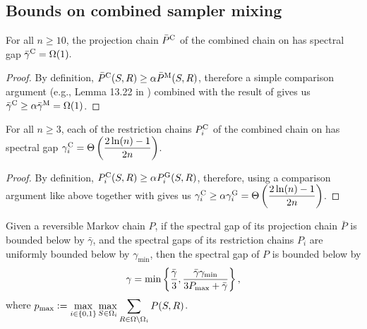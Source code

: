 \subsection{Bounds on combined sampler mixing}

\let\oldthelemma\thelemma
\renewcommand{\thelemma}{B2}
\begin{lemma} \label{lem:cproj}
  For all $n \geq 10$, the projection chain $\bar{P}^{\mathrm{C}}$ of the combined chain on \ising{} has spectral gap $\bar{\gamma}^{\mathrm{C}} = \Omega(1).$
\end{lemma}
\let\thelemma\oldthelemma

\begin{proof}
  By definition, $\bar{P}^{\mathrm{C}}(S, R) \geq \alpha \bar{P}^{\mathrm{M}}(S, R)$, therefore a simple comparison argument (e.g., Lemma 13.22 in \citep{levin08book}) combined with the result of  gives us $\bar{\gamma}^{\mathrm{C}} \geq \alpha \bar{\gamma}^{\mathrm{M}} = \Omega(1)$.
\end{proof}

\let\oldthelemma\thelemma
\renewcommand{\thelemma}{B3}
\begin{lemma} \label{lem:crest}
  For all $n \geq 3$, each of the restriction chains $P^{\mathrm{C}}_i$ of the combined chain on \ising{} has spectral gap $\gamma^{\mathrm{C}}_i = \Theta\left(\displaystyle\frac{2\ln(n) - 1}{2n}\right)$.
\end{lemma}
\let\thelemma\oldthelemma

\begin{proof}
  By definition, $P^{\mathrm{C}}_i(S, R) \geq \alpha P^{\mathrm{G}}_i(S, R)$, therefore, using a comparison argument like above together with  gives us $\gamma^{\mathrm{C}}_i \geq \alpha \gamma^{\mathrm{G}}_i = \Theta\left(\displaystyle\frac{2\ln(n) - 1}{2n}\right)$.
\end{proof}

\let\oldthetheorem\thetheorem
\renewcommand{\thetheorem}{B2}
\begin{theorem} \label{thm:jerrum04}
  Given a reversible Markov chain $P$, if the spectral gap of its projection chain $\bar{P}$ is bounded below by $\bar{\gamma}$, and the spectral gaps of its restriction chains $P_i$ are uniformly bounded below by $\gamma_{\textrm{min}}$, then the spectral gap of $P$ is bounded below by
  \begin{align*}
    \gamma = \min\left\{ \frac{\bar{\gamma}}{3}, \frac{\bar{\gamma}\gamma_{\textrm{min}}}{3P_{\textrm{max}} + \bar{\gamma}} \right\},
  \end{align*}
  where $p_{\textrm{max}} \vcentcolon= \displaystyle\max_{i \in \{0, 1\}}\max_{S \in \Omega_i} \sum_{R \in \Omega \setminus \Omega_i} P(S, R)$.
\end{theorem}
\let\thetheorem\oldthetheorem

